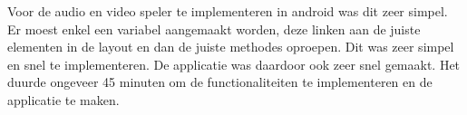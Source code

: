 Voor de audio en video speler te implementeren in android was dit zeer simpel. 
Er moest enkel een variabel aangemaakt worden, deze linken aan de juiste elementen
in de layout en dan de juiste methodes oproepen. Dit was zeer simpel en snel te
implementeren. De applicatie was daardoor ook zeer snel gemaakt. Het duurde ongeveer 45 minuten 
om de functionaliteiten te implementeren en de applicatie te maken.



